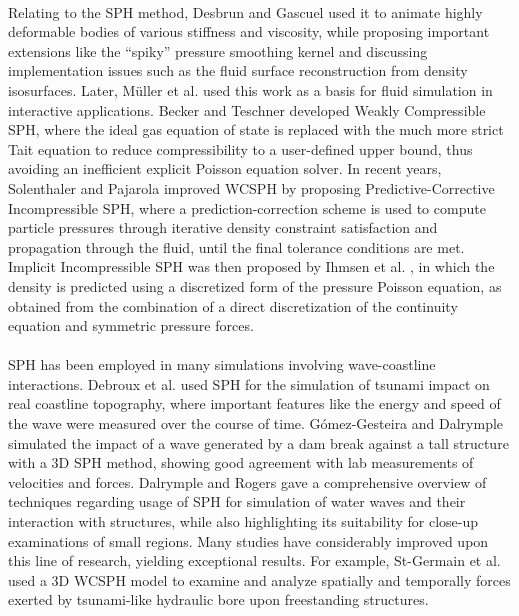 \documentclass{llncs}
\begin{document}
\paragraph{} Relating to the SPH method, Desbrun and Gascuel \cite{desbrun1996smoothed}
used it to animate highly deformable bodies of various stiffness and viscosity, while
proposing important extensions like the ``spiky'' pressure smoothing kernel and discussing
implementation issues such as the fluid surface reconstruction from density
isosurfaces. Later, M\"{u}ller et al. \cite{muller2003particle} used this work as a basis
for fluid simulation in interactive applications. Becker and Teschner
\cite{becker2007weakly} developed Weakly Compressible SPH, where the ideal gas equation of
state is replaced with the much more strict Tait equation to reduce compressibility to a
user-defined upper bound, thus avoiding an inefficient explicit Poisson equation
solver. In recent years, Solenthaler and Pajarola \cite{solenthaler2009predictive}
improved WCSPH by proposing Predictive-Corrective Incompressible SPH, where a
prediction-correction scheme is used to compute particle pressures through iterative
density constraint satisfaction and propagation through the fluid, until the final
tolerance conditions are met. Implicit Incompressible SPH was then proposed by Ihmsen et
al. \cite{ihmsen2014implicit}, in which the density is predicted using a discretized form
of the pressure Poisson equation, as obtained from the combination of a direct
discretization of the continuity equation and symmetric pressure forces.

\paragraph{} SPH has been employed in many simulations involving wave-coastline
interactions. Debroux et al. \cite{debroux2001three} used SPH for the simulation of
tsunami impact on real coastline topography, where important features like the energy and
speed of the wave were measured over the course of time. G\'{o}mez-Gesteira and Dalrymple
\cite{gomez2004} simulated the impact of a wave generated by a dam break against a tall
structure with a 3D SPH method, showing good agreement with lab measurements of velocities
and forces. Dalrymple and Rogers \cite{dalrymple2006} gave a comprehensive overview of
techniques regarding usage of SPH for simulation of water waves and their interaction with
structures, while also highlighting its suitability for close-up examinations of small
regions. Many studies have considerably improved upon this line of research, yielding
exceptional results. For example, St-Germain et al. \cite{st-germain2014} used a 3D WCSPH
model to examine and analyze spatially and temporally forces exerted by tsunami-like
hydraulic bore upon freestanding structures.
\end{document}
